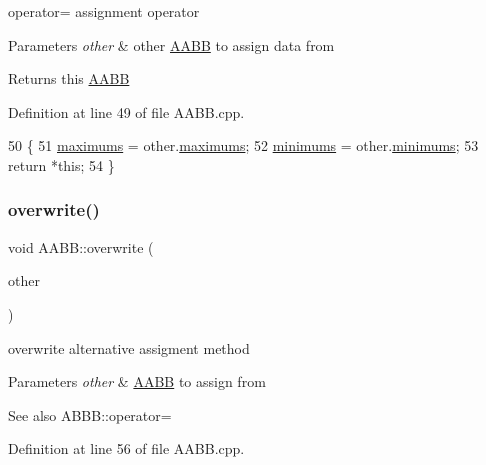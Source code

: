 operator= assignment operator 


\begin{DoxyParams}{Parameters}
{\em other} & other \hyperlink{class_a_a_b_b}{A\+A\+BB} to assign data from \\
\hline
\end{DoxyParams}
\begin{DoxyReturn}{Returns}
this \hyperlink{class_a_a_b_b}{A\+A\+BB} 
\end{DoxyReturn}


Definition at line 49 of file A\+A\+B\+B.\+cpp.


\begin{DoxyCode}
50 \{
51     \hyperlink{class_a_a_b_b_a1289c3a2e5c7a98f90d5bcdb8251a06f}{maximums} = other.\hyperlink{class_a_a_b_b_a1289c3a2e5c7a98f90d5bcdb8251a06f}{maximums};
52     \hyperlink{class_a_a_b_b_aaf1ec35e5c0258cd57e65429f93c14a2}{minimums} = other.\hyperlink{class_a_a_b_b_aaf1ec35e5c0258cd57e65429f93c14a2}{minimums};
53     \textcolor{keywordflow}{return} *\textcolor{keyword}{this};
54 \}
\end{DoxyCode}
\mbox{\label{class_a_a_b_b_a596eee6cf349fa4c1d95e42925a791e5}} 
\subsubsection{\texorpdfstring{overwrite()}{overwrite()}}
{\footnotesize\ttfamily void A\+A\+B\+B\+::overwrite (\begin{DoxyParamCaption}\item[{const \hyperlink{class_a_a_b_b}{A\+A\+BB} \&}]{other }\end{DoxyParamCaption})}



overwrite alternative assigment method 


\begin{DoxyParams}{Parameters}
{\em other} & \hyperlink{class_a_a_b_b}{A\+A\+BB} to assign from \\
\hline
\end{DoxyParams}
\begin{DoxySeeAlso}{See also}
A\+B\+B\+B\+::operator= 
\end{DoxySeeAlso}


Definition at line 56 of file A\+A\+B\+B.\+cpp.


